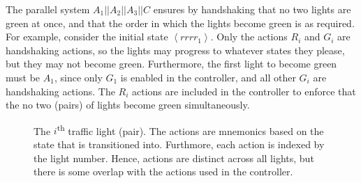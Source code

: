 \documentclass[11pt,letterpaper]{article}
\newcommand{\hs}{\vert \vert}
\newcommand{\state}[1]{\left\langle #1 \right\rangle}
\begin{document}
\begin{enumerate}
        The parallel system $A_1 \hs A_2 \hs A_3 \hs C$ ensures by handshaking
        that no two lights are green at once, and that the order in which the
        lights become green is as required. For example, consider the initial
        state $\state{r r r r_1}$. Only the actions $R_i$ and $G_i$ are
        handshaking actions, so the lights may progress to whatever states they
        please, but they may not become green. Furthermore, the first light to
        become green must be $A_1$, since only $G_1$ is enabled in the
        controller, and all other $G_i$ are handshaking actions. The $R_i$
        actions are included in the controller to enforce that the no two
        (pairs) of lights become green simultaneously.

        \begin{figure}[ht]
            \centering
            \caption{
                The $i$\textsuperscript{th} traffic light (pair). The actions
                are mnemonics based on the state that is transitioned into.
                Furthmore, each action is indexed by the light number.
                Hence, actions are distinct across all lights, but there is
                some overlap with the actions used in the controller.
            }
            \label{fig:light}
        \end{figure}


\end{enumerate}
\end{document}
